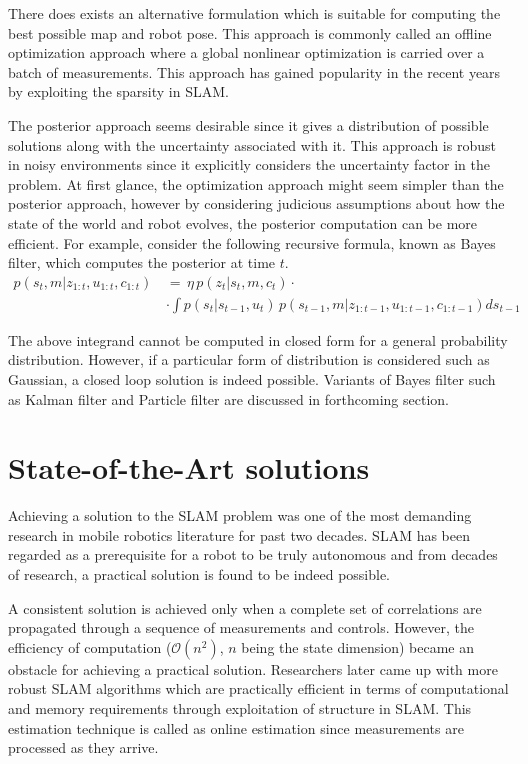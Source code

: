 There does exists an alternative formulation which is suitable for computing the best possible map and robot pose. This approach is commonly called an offline optimization approach where a global nonlinear optimization is carried over a batch of measurements. This approach has gained popularity in the recent years by exploiting the sparsity in SLAM. 

The posterior approach seems desirable since it gives a distribution of possible solutions along with the uncertainty associated with it. This approach is robust in noisy environments since it explicitly considers the uncertainty factor in the problem. At first glance, the optimization approach might seem simpler than the posterior approach, however by considering judicious assumptions about how the state of the world and robot evolves, the posterior computation can be more efficient. For example, consider the following recursive formula, known as Bayes filter, which computes the posterior at time $t$.
\begin{equation}
\begin{split}
p(s_t,m|z_{1:t},u_{1:t},c_{1:t})\,&=\,\eta\,p(z_t|s_t,m,c_t)\cdot \\
&\cdot\int p(s_t|s_{t-1},u_t)\,p(s_{t-1},m|z_{1:t-1},u_{1:t-1},c_{1:t-1})ds_{t-1} 
\end{split}
\label{bayes_filter}
\end{equation}

The above integrand cannot be computed in closed form for a general probability distribution. However, if a particular form of distribution is considered such as Gaussian, a closed loop solution is indeed possible. Variants of Bayes filter such as Kalman filter and Particle filter are discussed in forthcoming section.  

\section{State-of-the-Art solutions} \label{sec::state_art}
Achieving a solution to the SLAM problem was one of the most demanding research in mobile robotics literature for past two decades. SLAM has been regarded as a prerequisite for a robot to be truly autonomous and from decades of research, a practical solution is found to be indeed possible. 

A consistent solution is achieved only when a complete set of correlations are propagated through a sequence of measurements and controls. However, the efficiency of computation ($\mathcal{O}(n^2)$, $n$ being the state dimension) became an obstacle for achieving a practical solution. Researchers \cite{montemerlo2002conditional} later came up with more robust SLAM algorithms which are practically efficient in terms of computational and memory requirements through exploitation of structure in SLAM. This estimation technique is called as online estimation since measurements are processed as they arrive.

